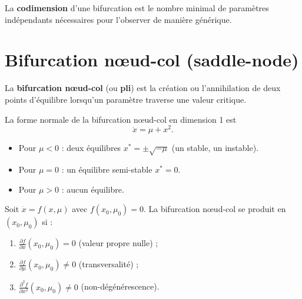 \begin{definition}[Codimension]
La \textbf{codimension} d'une bifurcation est le nombre minimal de
param\`etres ind\'ependants n\'ecessaires pour l'observer de mani\`ere
g\'en\'erique.
\end{definition}

\section{Bifurcation n\oe ud-col (saddle-node)}

\begin{definition}
La \textbf{bifurcation n\oe ud-col} (ou \textbf{pli}) est la cr\'eation ou
l'annihilation de deux points d'\'equilibre lorsqu'un param\`etre traverse
une valeur critique.
\end{definition}

\begin{theoreme}
\label{thm:saddle-node}
La forme normale de la bifurcation n\oe ud-col en dimension 1 est
\[
    \dot{x} = \mu + x^2.
\]
\begin{itemize}
    \item Pour $\mu < 0$ : deux \'equilibres $x^* = \pm\sqrt{-\mu}$
    (un stable, un instable).
    \item Pour $\mu = 0$ : un \'equilibre semi-stable $x^* = 0$.
    \item Pour $\mu > 0$ : aucun \'equilibre.
\end{itemize}
\end{theoreme}

\begin{theoreme}
Soit $\dot{x} = f(x, \mu)$ avec $f(x_0, \mu_0) = 0$. La bifurcation
n\oe ud-col se produit en $(x_0, \mu_0)$ si :
\begin{enumerate}
    \item $\frac{\partial f}{\partial x}(x_0, \mu_0) = 0$ (valeur propre nulle) ;
    \item $\frac{\partial f}{\partial \mu}(x_0, \mu_0) \neq 0$ (transversalit\'e) ;
    \item $\frac{\partial^2 f}{\partial x^2}(x_0, \mu_0) \neq 0$ (non-d\'eg\'en\'erescence).
\end{enumerate}
\end{theoreme}

\begin{center}
\end{center}

